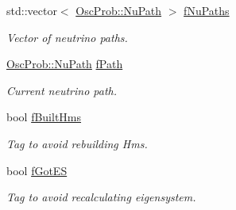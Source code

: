 \begin{DoxyCompactItemize}
std\+::vector$<$ \hyperlink{structOscProb_1_1NuPath}{Osc\+Prob\+::\+Nu\+Path} $>$ \hyperlink{classOscProb_1_1PMNS__Base_a69db9d57e12fc7cbe0431bc6c18fac93}{f\+Nu\+Paths}
\begin{DoxyCompactList}\small\item\em Vector of neutrino paths. \end{DoxyCompactList}\item 
\hyperlink{structOscProb_1_1NuPath}{Osc\+Prob\+::\+Nu\+Path} \hyperlink{classOscProb_1_1PMNS__Base_a849437aa8891fe042e86886ce8f81c6e}{f\+Path}
\begin{DoxyCompactList}\small\item\em Current neutrino path. \end{DoxyCompactList}\item 
bool \hyperlink{classOscProb_1_1PMNS__Base_a9ac3cadeac8db1b90f3152f476244780}{f\+Built\+Hms}
\begin{DoxyCompactList}\small\item\em Tag to avoid rebuilding Hms. \end{DoxyCompactList}\item 
bool \hyperlink{classOscProb_1_1PMNS__Base_a6dc5cd010d2d70b2324745b4e53e9839}{f\+Got\+ES}
\begin{DoxyCompactList}\small\item\em Tag to avoid recalculating eigensystem. \end{DoxyCompactList}\end{DoxyCompactItemize}
